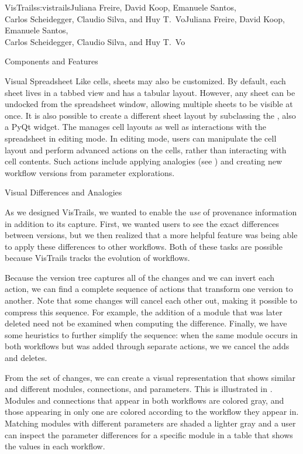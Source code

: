 \begin{aosachaptertoc}{VisTrails}{s:vistrails}{Juliana Freire, David Koop, Emanuele Santos, \\ Carlos Scheidegger, Claudio Silva, and Huy T.\ Vo}{Juliana Freire, David Koop, Emanuele Santos, \\ \hspace*{0.9cm} Carlos Scheidegger, Claudio Silva, and Huy T.\ Vo}
\begin{aosasect1}{Components and Features}
\begin{aosasect2}{Visual Spreadsheet}
Like cells, sheets may also be customized. By default, each sheet
lives in a tabbed view and has a tabular layout.  However, any sheet
can be undocked from the spreadsheet window, allowing multiple sheets
to be visible at once.  It is also possible to create a different
sheet layout by subclassing the , also a
PyQt widget. The  manages cell layouts as
well as interactions with the spreadsheet in editing mode. In editing
mode, users can manipulate the cell layout and perform advanced
actions on the cells, rather than interacting with cell contents.  Such
actions include applying analogies (see
) and creating new workflow versions
from parameter explorations.

\end{aosasect2}

\begin{aosasect2}{Visual Differences and Analogies}
\label{sec.vistrails.diff}

As we designed VisTrails, we wanted to enable the \emph{use} of
provenance information in addition to its capture.  First, we wanted
users to see the exact differences between versions, but we then realized that
a more helpful feature was being able to apply these differences to other
workflows.  Both of these tasks are possible because VisTrails tracks
the evolution of workflows.

Because the version tree captures all of the changes and we can invert
each action, we can find a complete sequence of actions that transform one
version to another.  Note that some changes will cancel each other
out, making it possible to compress this sequence. For example, the
addition of a module that was later deleted need not be examined when
computing the difference.  Finally, we have some heuristics to further
simplify the sequence: when the same module occurs in both workflows
but was added through separate actions, we we cancel the adds and
deletes.

From the set of changes, we can create a visual representation
that shows similar and different modules, connections, and parameters.
This is illustrated in 
. Modules and connections that
appear in both workflows are colored gray, and those appearing in only
one are colored according to the workflow they appear in.  Matching
modules with different parameters are shaded a lighter gray and a user
can inspect the parameter differences for a specific module in a table
that shows the values in each workflow.


\end{aosasect2}
\end{aosasect1}
\end{aosachaptertoc}

